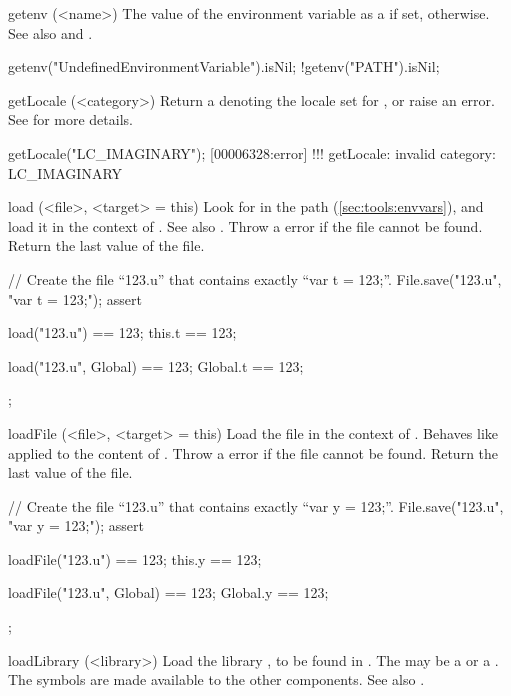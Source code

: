 \begin{urbiscriptapi}
\item[getenv](<name>)%
  The value of the environment variable  as a 
  if set,  otherwise.  See also  and
  .
\begin{urbiassert}
getenv("UndefinedEnvironmentVariable").isNil;
!getenv("PATH").isNil;
\end{urbiassert}


\item[getLocale](<category>)%
  Return a  denoting the locale set for , or
  raise an error.  See  for more details.
\begin{urbiscript}
getLocale("LC_IMAGINARY");
[00006328:error] !!! getLocale: invalid category: LC_IMAGINARY
\end{urbiscript}


\item[load](<file>, <target> = this)%
  Look for  in the \urbi path (\autoref{sec:tools:envvars}), and
  load it in the context of .  See also .
  Throw a  error if the file cannot be
  found.  Return the last value of the file.
\begin{urbiscript}
// Create the file ``123.u'' that contains exactly ``var t = 123;''.
File.save("123.u", "var t = 123;");
assert
{
  load("123.u") == 123;
  this.t == 123;

  load("123.u", Global) == 123;
  Global.t == 123;
};
\end{urbiscript}


\item[loadFile](<file>, <target> = this)%
  Load the \us file  in the context of .  Behaves like
   applied to the content of .  Throw a
   error if the file cannot be found.
  Return the last value of the file.
\begin{urbiscript}
// Create the file ``123.u'' that contains exactly ``var y = 123;''.
File.save("123.u", "var y = 123;");
assert
{
  loadFile("123.u") == 123;
  this.y == 123;

  loadFile("123.u", Global) == 123;
  Global.y == 123;
};

\end{urbiscript}


\item[loadLibrary](<library>)%
  Load the library , to be found in
  .  The  may be a
   or a .  The \Cxx symbols are made
  available to the other \Cxx components.  See also .



\end{urbiscriptapi}

